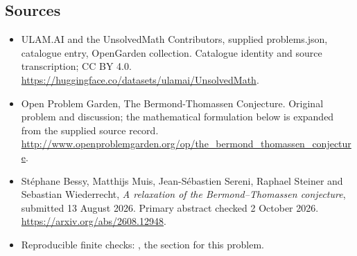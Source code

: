 \documentclass[11pt,a4paper]{article}
\begin{document}
\subsection{Sources}
\begin{itemize}
\item[S1] ULAM.AI and the UnsolvedMath Contributors, supplied problems.json, catalogue entry, OpenGarden collection. Catalogue identity and source transcription; CC BY 4.0.
\url{https://huggingface.co/datasets/ulamai/UnsolvedMath}.
\item[S2] Open Problem Garden, The Bermond-Thomassen Conjecture. Original problem and discussion; the mathematical formulation below is expanded from the supplied source record.
\url{http://www.openproblemgarden.org/op/the_bermond_thomassen_conjecture}.

\item[R1] St\'ephane Bessy, Matthijs Muis, Jean-S\'ebastien Sereni,
Raphael Steiner and Sebastian Wiederrecht, \emph{A relaxation of the
Bermond--Thomassen conjecture}, submitted 13 August 2026. Primary
abstract checked 2 October 2026. \url{https://arxiv.org/abs/2608.12948}.
\item[R2] Reproducible finite checks:
, the section for this problem.

\end{itemize}
\end{document}
